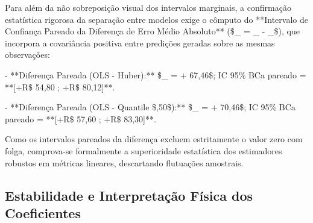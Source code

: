 \documentclass[12pt,a4paper]{article}
\begin{document}
\begin{table}[htbp]
\centering
\small
{}
\end{table}

Para além da não sobreposição visual dos intervalos marginais, a confirmação estatística rigorosa da separação entre modelos exige o cômputo do **Intervalo de Confiança Pareado da Diferença de Erro Médio Absoluto** (\$\Delta\_{} = \_{} - \_{}\$), que incorpora a covariância positiva entre predições geradas sobre as mesmas observações:

- **Diferença Pareada (OLS - Huber):** \$\Delta\_{} = + 67,46\$; IC 95\% BCa pareado = **[+R\$ 54,80 ; +R\$ 80,12]**.

- **Diferença Pareada (OLS - Quantile \$,50\$):** \$\Delta\_{} = + 70,46\$; IC 95\% BCa pareado = **[+R\$ 57,60 ; +R\$ 83,30]**.

Como os intervalos pareados da diferença excluem estritamente o valor zero com folga, comprova-se formalmente a superioridade estatística dos estimadores robustos em métricas lineares, descartando flutuações amostrais.


\subsection{Estabilidade e Interpretação Física dos Coeficientes}
\end{document}
